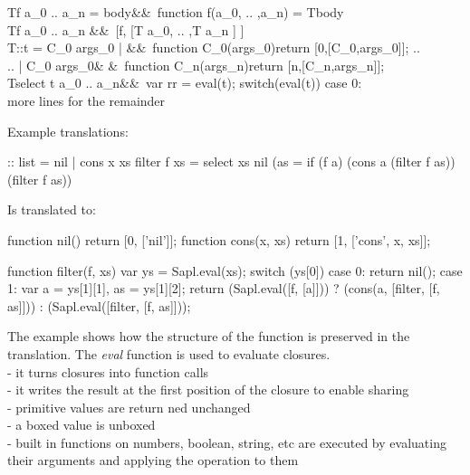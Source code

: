 \begin{haskell}
T\llbracket f a_0 .. a_n = body\rrbracket  &\equiv &\ function f(a_0, .. ,a_n) = T\llbracket body \rrbracket \\ 
T\llbracket f a_0 .. a_n \rrbracket &\equiv  &\ [f, [T \llbracket a_0\rrbracket , .. ,T \llbracket a_n ] ]\\
T\llbracket ::t = C_0  args_0  |   &\equiv  &\    function C_0(args_0){return [0,[C_0,args_0]];} .. \\
\hspace{1.15cm}.. | C_0  args_0\rrbracket   & &\ function C_n(args_n){return [n,[C_n,args_n]];} \\ 
T\llbracket select t a_0 .. a_n\rrbracket &\equiv  &\ var rr = eval(t); switch(eval(t)) {case 0: }\\
more lines for the remainder
\end{haskell}
%
Example translations:
\begin{CleanCode}
:: list = nil | cons x xs	
filter f xs = select xs nil (\a as = if (f a) (cons a (filter f as)) (filter f as))
\end{CleanCode}
%
Is translated to:
\begin{CleanCode}
function nil() {return [0, ['nil']];}
function cons(x, xs) {return [1, ['cons', x, xs]];}

function filter(f, xs) {
    var ys = Sapl.eval(xs);
    switch (ys[0]) {
    case 0:
        return nil();
    case 1:
        var a = ys[1][1],
            as = ys[1][2];
        return (Sapl.eval([f, [a]])) ? (cons(a, [filter, [f, as]])) : 
                                       (Sapl.eval([filter, [f, as]]));
    }
}\end{CleanCode}
The example shows how the structure of the function is preserved in the translation.
The \emph{eval} function is used to evaluate closures.\\
- it turns closures into function calls\\
- it writes the result at the first position of the closure to enable sharing\\
- primitive values are return ned unchanged\\
- a boxed value is unboxed\\
- built in functions on numbers, boolean, string, etc are executed by evaluating their arguments and applying the operation to them


